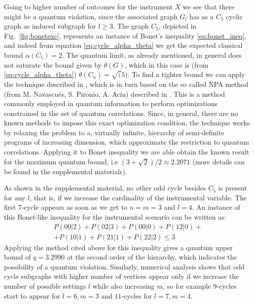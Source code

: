 \documentclass[letterpaper]{article}
\begin{document}
Going to higher number of outcomes for the instrument $X$ we see
that there might be a quantum violation, since the associated graph
$G_l$ has as a $C_5$ cyclic graph as induced subgraph for $l \ge 3$.
The graph $C_5$, depicted in Fig.~\ref{fig:bonetexc}, represents an
instance of Bonet's inequality \eqref{eq:bonet_ineq}, and indeed from
equation \eqref{eq:cycle_alpha_theta} we get the expected classical bound
$\alpha(C_5)=2$.  The quantum limit, as already mentioned, in general
does not saturate the bound given by $\theta(G)$, which in this case is
(from \eqref{eq:cycle_alpha_theta}) $\theta(C_n) = \sqrt(5)$.  To find a
tighter bound we can apply the technique described in \cite{rabelo2014},
which is in turn based on the so called NPA method (from M. Navascués,
S. Pironio, A. Acín) described in \cite{npa2008}.  This is a method
commonly employed in quantum information to perform optimizations
constrained in the set of quantum correlations. Since, in general,
there are no known methods to impose this exact optimization condition,
the technique works by relaxing the problem to a, virtually infinite,
hierarchy of semi-definite programs of increasing dimension, which
approximate the restriction to quantum correlations.  Applying it to
Bonet inequality we are able obtain the known result for the maximum
quantum bound, i.e $(3+\sqrt{2})/2 \approx 2.2071$ (more details can be
found in the supplemental materials).

As shown in the supplemental material, no other odd cycle besides $C_5$
is present for any $l$, that is, if we increase the cardinality of the
instrumental variable. The first $7$-cycle appears as soon as we get to
$n=m=3$ and $l=4$.
An instance of this Bonet-like inequality for the instrumental scenario can be written as:
\begin{multline}
    P(00|2) + P(02|3) + P(00|0) + P(12|0) + \\
    + P(10|1) + P(21|1) + P(22|2) \le 3 
    \label{eq:c7_instrumental433}
\end{multline}
Applying the method cited above for this inequality gives a quantum
upper bound of $q = 3.2990$ at the second order of the hierarchy, which
indicates the possibility of a quantum violation.  Similarly, numerical
analysis shows that odd cycle subgraphs with higher number of vertices
appear only if we increase the number of possible settings $l$ while also
increasing $m$, so for example $9$-cycles start to appear for $l=6, m=3$
and $11$-cycles for $l=7, m=4$.
\end{document}
